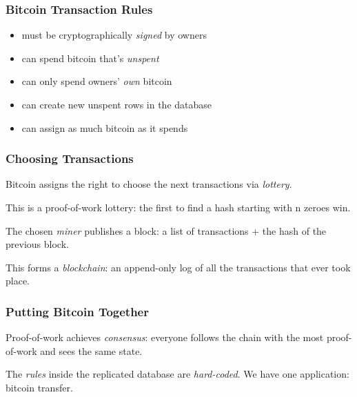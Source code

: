 \documentclass[aspectratio=169,17pt]{beamer}
\begin{document}
\begin{frame}
	\frametitle{Bitcoin Transaction Rules}
	\begin{itemize}
		\item must be cryptographically \emph{signed} by owners
			\pause{}
		\item can spend bitcoin that's \emph{unspent}
			\pause{}
		\item can only spend owners' \emph{own} bitcoin
			\pause{}
		\item can create new unspent rows in the database
			\pause{}
		\item can assign as much bitcoin as it spends
	\end{itemize}
\end{frame}

\begin{frame}
	\frametitle{Choosing Transactions}
	Bitcoin assigns the right to choose the next transactions via \emph{lottery}.

	This is a proof-of-work lottery: the first to find a hash starting with n zeroes win.
\end{frame}

\begin{frame}
	The chosen \emph{miner} publishes a block: a list of transactions + the hash of the previous block.

	This forms a \emph{blockchain}: an append-only log of all the transactions that ever took place.
\end{frame}
\begin{frame}
	\frametitle{Putting Bitcoin Together}

	Proof-of-work achieves \emph{consensus}: everyone follows the chain with the most proof-of-work and sees the same state.

	The \emph{rules} inside the replicated database are \emph{hard-coded}.
	We have one application: bitcoin transfer.
\end{frame}
\end{document}
